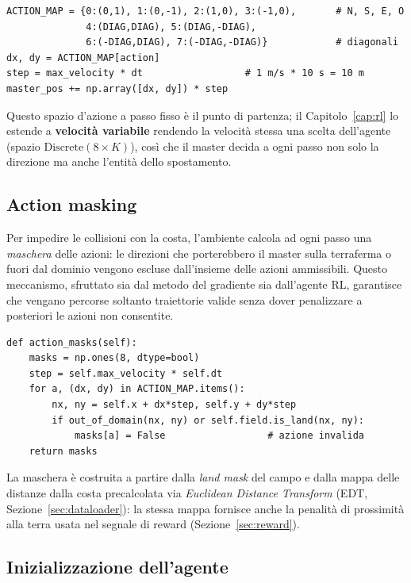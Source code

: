 \begin{lstlisting}
ACTION_MAP = {0:(0,1), 1:(0,-1), 2:(1,0), 3:(-1,0),       # N, S, E, O
              4:(DIAG,DIAG), 5:(DIAG,-DIAG),
              6:(-DIAG,DIAG), 7:(-DIAG,-DIAG)}            # diagonali
dx, dy = ACTION_MAP[action]
step = max_velocity * dt                  # 1 m/s * 10 s = 10 m
master_pos += np.array([dx, dy]) * step
\end{lstlisting}

Questo spazio d'azione a passo fisso \`e il punto di partenza; il Capitolo~\ref{cap:rl} lo
estende a \textbf{velocit\`a variabile} rendendo la velocit\`a stessa una scelta
dell'agente (spazio $\text{Discrete}(8\times K)$), cos\`i che il master decida a ogni passo
non solo la direzione ma anche l'entit\`a dello spostamento.

\subsection{Action masking}
\label{sec:masking}

Per impedire le collisioni con la costa, l'ambiente calcola ad ogni passo una
\emph{maschera} delle azioni: le direzioni che porterebbero il master sulla terraferma o
fuori dal dominio vengono escluse dall'insieme delle azioni ammissibili. Questo
meccanismo, sfruttato sia dal metodo del gradiente sia dall'agente RL, garantisce che
vengano percorse soltanto traiettorie valide senza dover penalizzare a posteriori le
azioni non consentite.

\begin{lstlisting}
def action_masks(self):
    masks = np.ones(8, dtype=bool)
    step = self.max_velocity * self.dt
    for a, (dx, dy) in ACTION_MAP.items():
        nx, ny = self.x + dx*step, self.y + dy*step
        if out_of_domain(nx, ny) or self.field.is_land(nx, ny):
            masks[a] = False                  # azione invalida
    return masks
\end{lstlisting}

La maschera \`e costruita a partire dalla \emph{land mask} del campo e dalla mappa delle
distanze dalla costa precalcolata via \emph{Euclidean Distance Transform} (EDT,
Sezione~\ref{sec:dataloader}): la stessa mappa fornisce anche la penalit\`a di prossimit\`a
alla terra usata nel segnale di reward (Sezione~\ref{sec:reward}).

\subsection{Inizializzazione dell'agente}
\label{sec:spawn}

